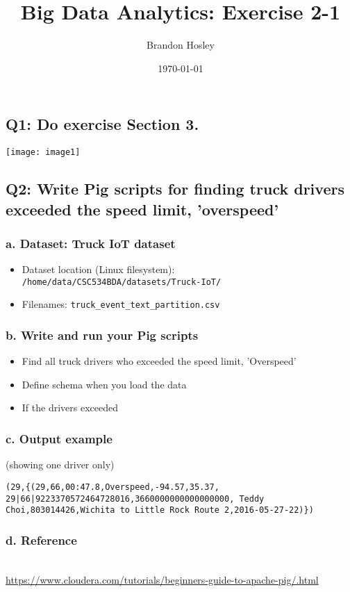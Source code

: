 \documentclass[]{article}
\title{Big Data Analytics: Exercise 2-1}
\author{Brandon Hosley}
\date{\today}
\begin{document}
\maketitle

\subsection*{Q1: Do exercise Section 3.} 

\texttt{[image: image1]} \vspace{-1.5em}

\subsection*{Q2: Write Pig scripts for finding truck drivers exceeded the speed limit, 'overspeed'}
\subsubsection*{a. Dataset: Truck IoT dataset}
\begin{itemize}[before=\itshape,font=\normalfont]
	\item Dataset location (Linux filesystem): \\
	\texttt{/home/data/CSC534BDA/datasets/Truck-IoT/}
	\item Filenames: 
	\texttt{truck_event_text_partition.csv}
\end{itemize} 


\subsubsection*{b. Write and run your Pig scripts}
\begin{itemize}[before=\itshape,font=\normalfont]
	\item Find all truck drivers who exceeded the speed limit, 'Overspeed'
	\item Define schema when you load the data
	\item If the drivers exceeded
\end{itemize} 


\subsubsection*{c. Output example }(showing one driver only)
\begin{verbatim}
(29,{(29,66,00:47.8,Overspeed,-94.57,35.37, 29|66|9223370572464728016,3660000000000000000, Teddy Choi,803014426,Wichita to Little Rock Route 2,2016-05-27-22)})
\end{verbatim}

\subsubsection*{d. Reference} \\
\href{https://www.cloudera.com/tutorials/beginners-guide-to-apache-pig/.html}	{https://www.cloudera.com/tutorials/beginners-guide-to-apache-pig/.html}
\end{document}

